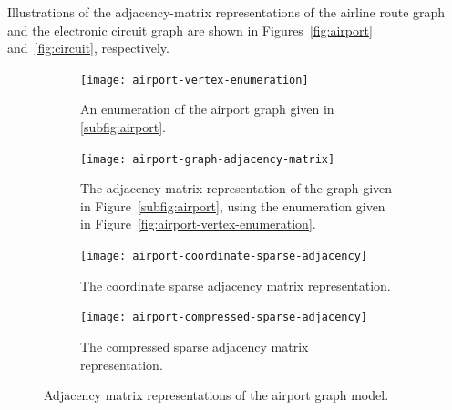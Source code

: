 Illustrations of the adjacency-matrix representations of the airline route graph and the electronic circuit graph are shown in Figures~\ref{fig:airport} and~\ref{fig:circuit}, respectively.

\begin{figure}[bh]
  \begin{subfigure}[t]{0.175\textwidth}
    \centering
    \texttt{[image: airport-vertex-enumeration]}
    \caption{\label{fig:ariport-vertex-enumeration}
    An enumeration of the airport graph given in \protect\ref{subfig:airport}.}
  \end{subfigure}
  \hspace{1em}
  \begin{subfigure}[t]{0.25\textwidth}
    \centering
    \texttt{[image: airport-graph-adjacency-matrix]}
    \caption{\label{fig:airport-graph-adjacency-matrix}
    The adjacency matrix representation of the graph given in Figure~\protect\ref{subfig:airport},
    using the enumeration given in Figure~\protect\ref{fig:airport-vertex-enumeration}.}
  \end{subfigure}
  \hspace{1em}
  \begin{subfigure}[t]{0.175\textwidth}
    \small
    \centering
    \texttt{[image: airport-coordinate-sparse-adjacency]}
    \caption{\label{fig:airport-coordinate-sparse-adjacency}
    The coordinate sparse adjacency matrix representation.}
  \end{subfigure}
  \hspace{1em}
  \begin{subfigure}[t]{0.3\textwidth}
    \small
    \centering
    \texttt{[image: airport-compressed-sparse-adjacency]}
    \caption{\label{fig:airport-compressed-sparse-adjacency}
    The compressed sparse adjacency matrix representation.}
  \end{subfigure}
  \caption{Adjacency matrix representations of the airport graph model.\label{fig:airport-representation}}
\end{figure}



